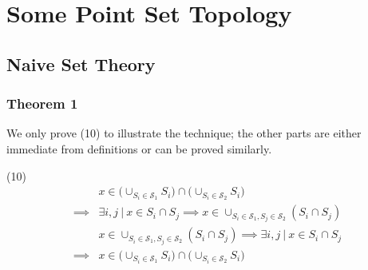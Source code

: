 \section{Some Point Set Topology}

\subsection{Naive Set Theory}

\subsubsection{Theorem 1}
We only prove (10) to illustrate the technique; the other parts are either immediate
from definitions or can be proved similarly.

(10) 
\begin{align*}
        &x \in \bigg(\cup_{S_i \in \mathcal{S}_1} S_i\bigg) \cap \bigg(\cup_{S_i \in \mathcal{S}_2} S_i\bigg) \\
        \implies &\exists i, j \: | \: x \in S_i \cap S_j \implies x \in \cup_{S_i \in \mathcal{S}_1, S_j \in \mathcal{S}_2} (S_i \cap S_j) \\
                 &x \in \cup_{S_i \in \mathcal{S}_1, S_j \in \mathcal{S}_2} (S_i \cap S_j) \implies \exists i, j \: | \: x \in S_i \cap S_j \\
        \implies &x \in \bigg(\cup_{S_i \in \mathcal{S}_1} S_i\bigg) \cap \bigg(\cup_{S_i \in \mathcal{S}_2} S_i\bigg)
\end{align*}

